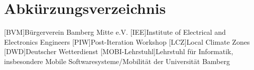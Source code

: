 \chapter*{Abkürzungsverzeichnis}

\begin{acronym}
    [BVM]{Bürgerverein Bamberg Mitte e.V.}
    [IEE]{Institute of Electrical and Electronics Engineers}
    [PIW]{Post-Iteration Workshop}
    [LCZ]{Local Climate Zones}
    [DWD]{Deutscher Wetterdienst}
    [MOBI-Lehrstuhl]{Lehrstuhl für Informatik, insbesondere Mobile Softwaresysteme/Mobilität der Universität Bamberg}
\end{acronym}
